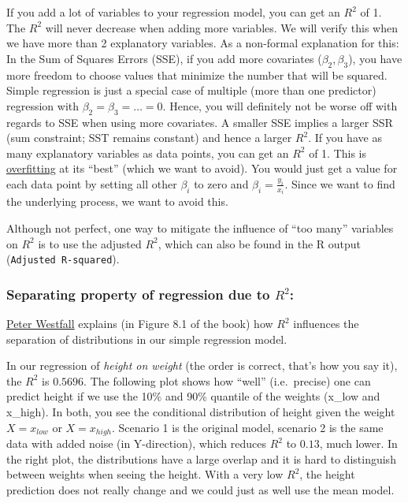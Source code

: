 \documentclass[
]{book}
\begin{document}
If you add a lot of variables to your regression model, you can get an
\(R^2\) of 1. The \(R^2\) will never decrease when adding more variables.
We will verify this when we have more than 2 explanatory variables.
As a non-formal explanation for this: In the Sum of Squares Errors (SSE),
if you add more covariates (\(\beta_2, \beta_3\)), you have more freedom
to choose values that minimize the number that will be squared. Simple regression
is just a special case of multiple (more than one predictor) regression with \(\beta_2=\beta_3=\dots=0\).
Hence, you will definitely not be worse off with regards to SSE when using more covariates.
A smaller SSE implies a larger SSR (sum constraint; SST remains constant) and hence a larger \(R^2\).
If you have as many explanatory variables as data points, you can get an \(R^2\) of 1. This is
\href{https://en.wikipedia.org/wiki/Overfitting}{overfitting} at its ``best'' (which we want to avoid).
You would just get a value for each data point by setting all other \(\beta_i\) to zero and
\(\beta_i = \frac{y_i}{x_i}\).
Since we want to find the underlying process, we want to avoid this.

Although not perfect, one way to mitigate the influence of ``too many'' variables
on \(R^2\) is to use the adjusted \(R^2\), which can also be found in the R output (\texttt{Adjusted\ R-squared}).

\subsubsection{\texorpdfstring{Separating property of regression due to \(R^2\):}{Separating property of regression due to R\^{}2:}}\label{seperating_property}

\href{https://www.routledge.com/Understanding-Regression-Analysis-A-Conditional-Distribution-Approach/Westfall-Arias/p/book/9780367493516?srsltid=AfmBOore3O_Ciecl0TTkr9AjPIY1d6OmbQa7o7IAdKpTSkD8s9HkwzD4}{Peter Westfall}
explains (in Figure 8.1 of the book) how \(R^2\) influences the separation of distributions in our simple regression model.

In our regression of \emph{height on weight} (the order is correct, that's how you say it),
the \(R^2\) is \(0.5696\). The following plot shows how ``well'' (i.e.~precise) one can predict
height if we use the 10\% and 90\% quantile of the weights (x\_low and x\_high).
In both, you see the conditional distribution of height given the weight \(X = x_{low}\) or \(X = x_{high}\).
Scenario 1 is the original model, scenario 2 is the same data with added noise (in Y-direction),
which reduces \(R^2\) to \(0.13\), much lower. In the right plot, the distributions have a large
overlap and it is hard to distinguish between weights when seeing the height.
With a very low \(R^2\), the height prediction does not really change and we could just as well
use the mean model.
\end{document}

